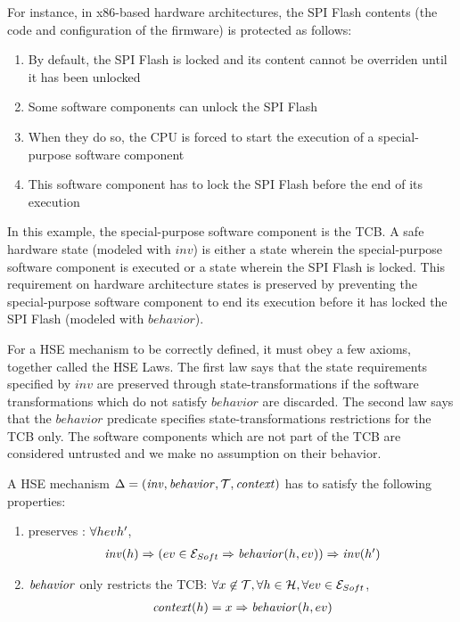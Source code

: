   For instance, in x86-based hardware architectures, the SPI Flash contents (the
  code and configuration of the firmware) is protected as follows:

  \begin{enumerate}
  \item By default, the SPI Flash is locked and its content cannot be overriden
    until it has been unlocked
  \item Some software components can unlock the SPI Flash
  \item When they do so, the CPU is forced to start the execution of a
    special-purpose software component
  \item This software component has to lock the SPI Flash before the end of its
    execution
  \end{enumerate}
  In this example, the special-purpose software component is the TCB. A safe
  hardware state (modeled with $inv$) is either a state wherein the
  special-purpose software component is executed or a state wherein the SPI
  Flash is locked. This requirement on hardware architecture states is preserved
  by preventing the special-purpose software component to end its execution
  before it has locked the SPI Flash (modeled with $behavior$).

  For a HSE mechanism to be correctly defined, it must obey a few axioms,
  together called the HSE Laws. The first law says that the state requirements
  specified by $inv$ are preserved through state-transformations if the software
  transformations which do not satisfy $behavior$ are discarded. The second law
  says that the $behavior$ predicate specifies state-transformations
  restrictions for the TCB only. The software components which are not part of
  the TCB are considered untrusted and we make no assumption on their behavior.

  \begin{definition}
    \label{def:laws}
    A HSE mechanism $\Delta = (\mathit{inv}, \mathit{behavior}, \mathcal{T}, \mathit{context})$ has to satisfy
    the following properties:
    \begin{enumerate}
    \item {} preserves : $\forall \transitionLTS{Ez}{h}{ev}{h'}$,
      \[ \begin{array}{l} \mathit{inv}(h) \Rightarrow (ev \in \mathcal{E}_{Soft} \Rightarrow
          \mathit{behavior}(h,ev)) \Rightarrow \mathit{inv}(h')
         \end{array}
       \]
     \item $\mathit{behavior}$ only restricts the TCB:
       $\forall x \not\in \mathcal{T}, \forall h \in \mathcal{H}, \forall ev \in
       \mathcal{E}_{Soft}$,
       \[
         \begin{array}{l}
           \mathit{context}(h) = x \Rightarrow \mathit{behavior}(h, ev)
         \end{array}
       \]
     \end{enumerate}
   \end{definition}

